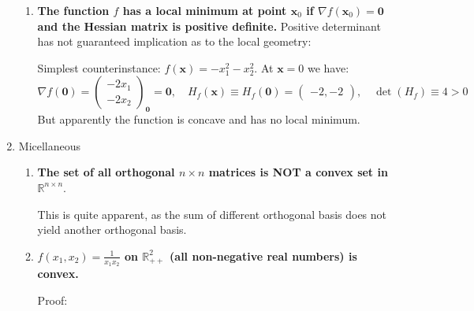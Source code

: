 \documentclass[a4paper, 10pt]{article}
\begin{document}
\begin{enumerate}[label=(\alph*)]
\begin{enumerate}[label=(\arabic*)]
    \item \textbf{The function $f$ has a local minimum at point $\mathbf{x}_0$ if $\nabla f(\mathbf{x}_0) = \mathbf{0}$ and the Hessian matrix is positive definite.} Positive determinant has not guaranteed implication as to the local geometry:
    
    Simplest counterinstance: $f(\mathbf{x}) = -x_1^2 - x_2^2$. At $\mathbf{x} = 0$ we have:
    \begin{equation}
        \nabla f(\mathbf{0}) = \begin{pmatrix} -2x_1 \\ -2x_2 \end{pmatrix}_\mathbf{0} = \mathbf{0},\quad 
        H_f(\mathbf{x}) \equiv H_f(\mathbf{0}) = \begin{pmatrix}-2, -2\end{pmatrix},\quad {\det}\left(H_f\right) \equiv 4 > 0
    \end{equation}
    But apparently the function is concave and has no local minimum.
    
\end{enumerate}

\item Micellaneous
\begin{enumerate}[label=(\arabic*)]
    \item \textbf{The set of all orthogonal $n\times n$ matrices is NOT a convex set in $\mathbb{R}^{n\times n}$}.
    
    This is quite apparent, as the sum of different orthogonal basis does not yield another orthogonal basis.
    
    \item \textbf{$f(x_1,x_2) = \frac{1}{x_1x_2}$ on $\mathbb{R}_{++}^2$ (all non-negative real numbers) is convex.}
    
    Proof:
    

\end{enumerate}
\end{enumerate}
\end{document}
